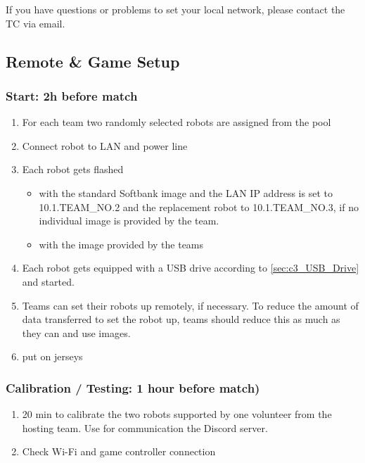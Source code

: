 If you have questions or problems to set your local network, please contact the TC via email. 

\subsection{Remote \& Game Setup}

\subsubsection{Start: 2h before match}

    \begin{enumerate}
        \item For each team two randomly selected robots are assigned from the pool
        \item Connect robot to LAN and power line
        \item Each robot gets flashed 
        \begin{itemize}
            \item with the standard Softbank image and the LAN IP address is set to 10.1.TEAM\_NO.2 and the replacement robot to 10.1.TEAM\_NO.3, if no individual image is provided by the team.
            \item with the image provided by the teams
		\end{itemize}
		\item Each robot gets equipped with a USB drive according to \ref{sec:c3_USB_Drive} and started.
        \item Teams can set their robots up remotely, if necessary. To reduce the amount of data transferred to set the robot up, teams should reduce this as much as they can and use images.
        \item put on jerseys
    \end{enumerate}

\subsubsection{Calibration / Testing: 1 hour before match)}

    \begin{enumerate}
        \item 20 min to calibrate the two robots supported by one volunteer from the hosting team. Use for communication the Discord server.
        \item  Check Wi-Fi and game controller connection
    \end{enumerate}


